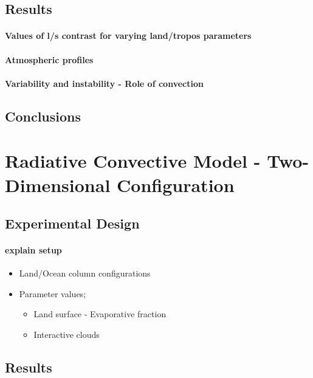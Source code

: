 \subsection{Results}
\paragraph{Values of l/s contrast for varying land/tropos parameters}
\paragraph{Atmospheric profiles}
\paragraph{Variability and instability - Role of convection}
\subsection{Conclusions}


\section{Radiative Convective Model - Two-Dimensional Configuration}

\subsection{Experimental Design}

\paragraph{explain setup}
\begin{itemize}
	\item Land/Ocean column configurations
	\item Parameter values;
		\begin{itemize}
			\item Land surface - Evaporative fraction
			\item Interactive clouds
		\end{itemize}
\end{itemize}


\subsection{Results}

